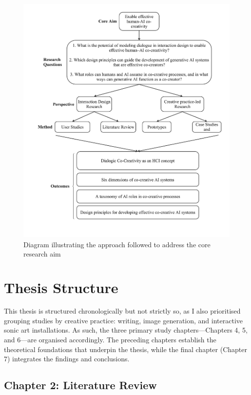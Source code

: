 \begin{figure}[hbt!]
    \centering
    \includegraphics[width=1\linewidth]{Intro - Frame 1 (2).jpg}
    \caption{Diagram illustrating the approach followed to address the core research aim}
    \label{fig:approach_figure}
\end{figure}

\clearpage

\section*{Thesis Structure}

This thesis is structured chronologically but not strictly so, as I also prioritised grouping studies by creative practice: writing, image generation, and interactive sonic art installations. As such, the three primary study chapters—Chapters 4, 5, and 6—are organised accordingly. The preceding chapters establish the theoretical foundations that underpin the thesis, while the final chapter (Chapter 7) integrates the findings and conclusions.

\subsection*{Chapter 2: Literature Review}

